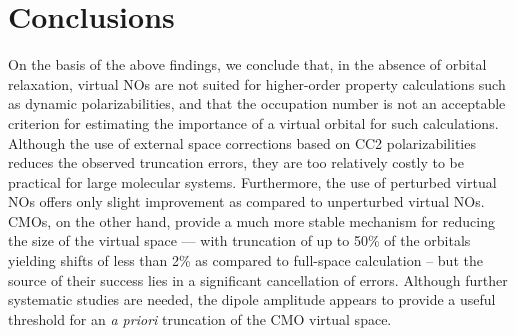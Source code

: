 \section{Conclusions}

On the basis of the above findings, we conclude that, in the absence of
orbital relaxation, virtual NOs are not
suited for higher-order property calculations such as dynamic
polarizabilities, and that the occupation number is not an acceptable
criterion for estimating the importance of a virtual orbital for such
calculations.  Although the use of external space corrections based on CC2
polarizabilities reduces the observed truncation errors, they are too
relatively costly to be practical for large molecular systems.  Furthermore,
the use of perturbed virtual NOs offers only slight improvement as compared to
unperturbed virtual NOs.  CMOs, on the other hand, provide a much more stable
mechanism for reducing the size of the virtual space --- with truncation of up
to 50\% of the orbitals yielding shifts of less than 2\% as compared to
full-space calculation -- but the source of their success lies in a
significant cancellation of errors.  Although further systematic studies are
needed, the dipole amplitude appears to provide a useful threshold for an {\em
a priori} truncation of the CMO virtual space.

%

\clearpage
%
%

\newpage

%

%
